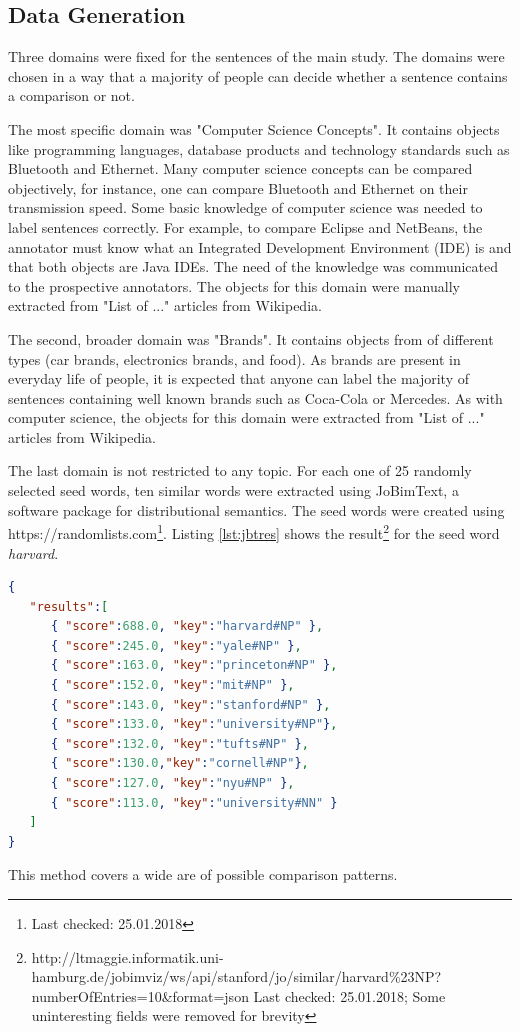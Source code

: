 \subsection{Data Generation}
Three domains were fixed for the sentences of the main study. The domains were chosen in a way that a majority of people can decide whether a sentence contains a comparison or not.

The most specific domain was "Computer Science Concepts". It contains objects like programming languages, database products and technology standards such as Bluetooth and Ethernet.  Many computer science concepts can be compared objectively, for instance, one can compare Bluetooth and Ethernet on their transmission speed. Some basic knowledge of computer science was needed to label sentences correctly. For example, to compare Eclipse and NetBeans, the annotator must know what an Integrated Development Environment (IDE) is and that both objects are Java IDEs.  The need of the knowledge was communicated to the prospective annotators. The objects for this domain were manually extracted from "List of ..." articles from Wikipedia.

The second, broader domain was "Brands". It contains objects from of different types (car brands, electronics brands, and food). As brands are present in everyday life of people, it is expected that anyone can label the majority of sentences containing well known brands such as Coca-Cola or Mercedes. As with computer science, the objects for this domain were extracted from "List of ..." articles from Wikipedia.

The last domain is not restricted to any topic. For each one of 25 randomly selected seed words, ten similar words were extracted using JoBimText, a software package for distributional semantics. The seed words were created using https://randomlists.com\footnote{Last checked: 25.01.2018}. Listing \ref{lst:jbtres} shows the result\footnote{http://ltmaggie.informatik.uni-hamburg.de/jobimviz/ws/api/stanford/jo/similar/harvard\%23NP?numberOfEntries=10&format=json Last checked: 25.01.2018; Some uninteresting fields were removed for brevity} for the seed word \emph{harvard}.

\begin{lstlisting}[language=json,label=lst:jbtres,caption=Similar words to "Harvard"]
{
   "results":[
      { "score":688.0, "key":"harvard#NP" },
      { "score":245.0, "key":"yale#NP" },
      { "score":163.0, "key":"princeton#NP" },
      { "score":152.0, "key":"mit#NP" },
      { "score":143.0, "key":"stanford#NP" },
      { "score":133.0, "key":"university#NP"},
      { "score":132.0, "key":"tufts#NP" },
      { "score":130.0,"key":"cornell#NP"},
      { "score":127.0, "key":"nyu#NP" },
      { "score":113.0, "key":"university#NN" }
   ]
}
\end{lstlisting}
This method covers a wide are of possible comparison patterns.\newline

